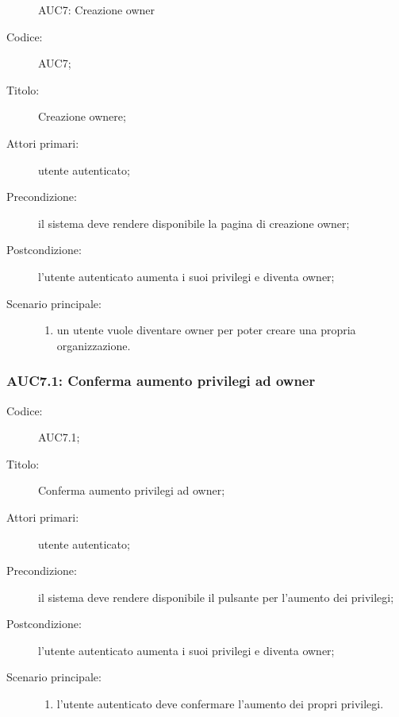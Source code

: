 \documentclass[../../../analisi-dei-requisiti.tex]{subfiles}
\begin{document}
\begin{figure}[H]
  \centering
  \caption{AUC7: Creazione owner}%
  \label{fig:AUC7}
\end{figure}

\begin{description}
  \item[Codice:] AUC7;
  \item[Titolo:] Creazione ownere;
  \item[Attori primari:] utente autenticato;
  \item[Precondizione:] il sistema deve rendere disponibile la pagina di creazione owner;
  \item[Postcondizione:] l'utente autenticato aumenta i suoi privilegi e diventa owner;
  \item[Scenario principale:]
  \begin{enumerate}
    \item un utente vuole diventare owner per poter creare una propria organizzazione.
  \end{enumerate}
\end{description}

\subsubsection{AUC7.1: Conferma aumento privilegi ad owner}%
\label{subs:AUC7.1}
\begin{description}
  \item[Codice:] AUC7.1;
  \item[Titolo:] Conferma aumento privilegi ad owner;
  \item[Attori primari:] utente autenticato;
  \item[Precondizione:] il sistema deve rendere disponibile il pulsante per l'aumento dei privilegi;
  \item[Postcondizione:] l'utente autenticato aumenta i suoi privilegi e diventa owner;
  \item[Scenario principale:]
  \begin{enumerate}
    \item l'utente autenticato deve confermare l'aumento dei propri privilegi.
  \end{enumerate}
\end{description}
\end{document}
